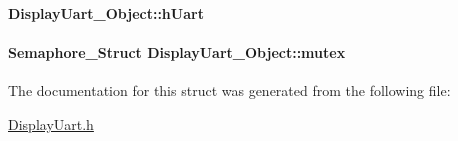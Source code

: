 \paragraph[{h\+Uart}]{ Display\+Uart\+\_\+\+Object\+::h\+Uart}\label{struct_display_uart___object_a8b35f7e4e65999298f8e461817545f5c}
\paragraph[{mutex}]{\setlength{\rightskip}{0pt plus 5cm}Semaphore\+\_\+\+Struct Display\+Uart\+\_\+\+Object\+::mutex}\label{struct_display_uart___object_a171c8429febbdb95f53041c14ab3cb4f}


The documentation for this struct was generated from the following file\+:\begin{DoxyCompactItemize}
\item 
\hyperlink{_display_uart_8h}{Display\+Uart.\+h}\end{DoxyCompactItemize}
